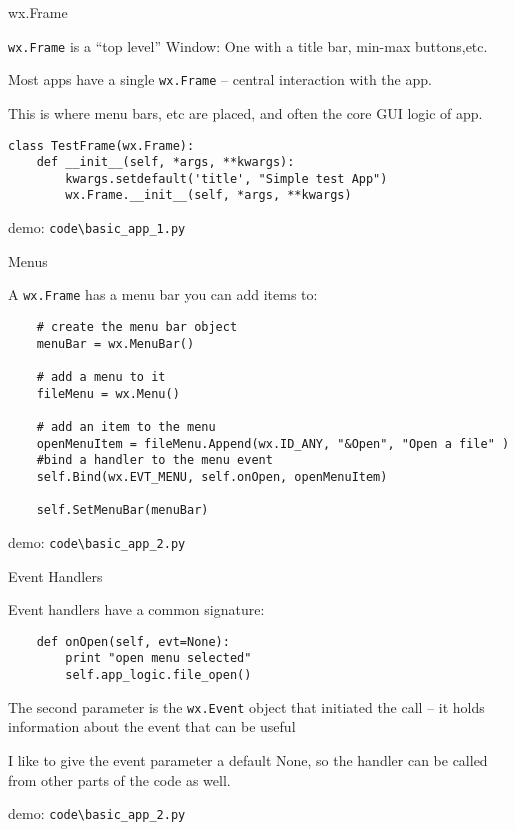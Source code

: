 \documentclass{beamer}
\begin{document}
\begin{frame}[fragile]{wx.Frame}

\vfill
{\Large \verb`wx.Frame` is a ``top level'' Window: One with a title bar, min-max buttons,etc.}

\vfill
{\Large Most apps have a single \verb`wx.Frame` -- central interaction with the app.} 

\vfill
{\Large This is where menu bars, etc are placed, and often the core GUI logic of app.} 


\begin{verbatim}
class TestFrame(wx.Frame):
    def __init__(self, *args, **kwargs):
        kwargs.setdefault('title', "Simple test App")
        wx.Frame.__init__(self, *args, **kwargs)
\end{verbatim}


\vfill
demo: \verb`code\basic_app_1.py`

\end{frame}


\begin{frame}[fragile]{Menus}

\vfill
{\Large A \verb`wx.Frame` has a menu bar you can add items to:}

\begin{verbatim}
    # create the menu bar object
    menuBar = wx.MenuBar()
        
    # add a menu to it
    fileMenu = wx.Menu()

    # add an item to the menu
    openMenuItem = fileMenu.Append(wx.ID_ANY, "&Open", "Open a file" )
    #bind a handler to the menu event
    self.Bind(wx.EVT_MENU, self.onOpen, openMenuItem)

    self.SetMenuBar(menuBar)
\end{verbatim}
        
\vfill
demo: \verb`code\basic_app_2.py`

\end{frame}

\begin{frame}[fragile]{Event Handlers}

\vfill
{\Large Event handlers have a common signature:}

\vfill
\begin{verbatim}
    def onOpen(self, evt=None):
        print "open menu selected"
        self.app_logic.file_open()
\end{verbatim}

\vfill
{\large The second parameter is the \verb`wx.Event` object that initiated the call -- it holds information about the event that can be useful}

\vfill
{\large I like to give the event parameter a default None, so the handler can be called from other parts of the code as well.}
        
\vfill
demo: \verb`code\basic_app_2.py`

\end{frame}
\end{document}
